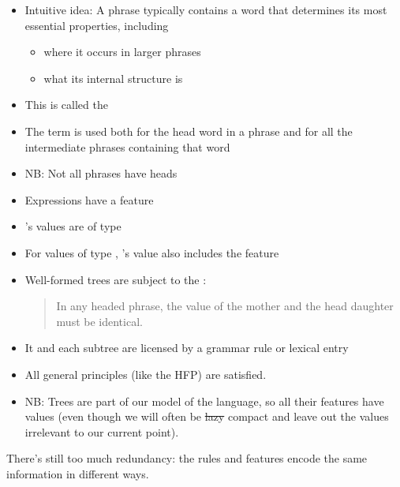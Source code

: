 \documentclass[a4paper,landscape,headrule,footrule]{foils}
\begin{document}
\begin{itemize}
\item Intuitive idea: A phrase typically contains a word that
determines its most essential properties, including
\begin{itemize}
\item where it occurs in larger phrases
\item what its internal structure is
\end{itemize}
\item This is called the 
\item The term  is used both for the head word in a
phrase and for all the intermediate phrases containing
that word
\item NB: Not all phrases have heads
\end{itemize}

\begin{itemize}
\item Expressions have a feature 
\item {}’s values are of type 
\item For  values of type , ’s
value also includes the feature 
\item Well-formed trees are subject to the :
\begin{quote}
  In any headed phrase, the 
value of the mother and the head daughter
must be identical.
\end{quote}
\end{itemize}

\begin{itemize}
\item It and each subtree are licensed by a grammar rule
or lexical entry
\item All general principles (like the HFP) are satisfied.
\item NB: Trees are part of our model of the language,
so all their features have values (even though we
will often be \sout{lazy} compact and leave out the values
irrelevant to our current point).
\end{itemize}


There’s still too much redundancy: the rules and features encode the same information in different ways.
\end{document}

